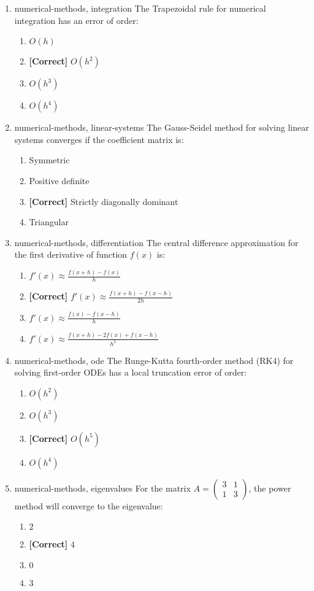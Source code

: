 \documentclass{article}
\newenvironment{problem}{\item}{}
\newcommand{\choice}{\item}
\newcommand{\correctchoice}{\item \textbf{[Correct] }}
\newcommand{\tags}[1]{#1} %
\begin{document}
\begin{enumerate}
        \begin{problem}
            \tags{numerical-methods, integration}
            The Trapezoidal rule for numerical integration has an error of order:
            \begin{enumerate}
                \choice $O(h)$
                \correctchoice $O(h^2)$
                \choice $O(h^3)$
                \choice $O(h^4)$
            \end{enumerate}
        \end{problem}
        
        \begin{problem}
            \tags{numerical-methods, linear-systems}
            The Gauss-Seidel method for solving linear systems converges if the coefficient matrix is:
            \begin{enumerate}
                \choice Symmetric
                \choice Positive definite
                \correctchoice Strictly diagonally dominant
                \choice Triangular
            \end{enumerate}
        \end{problem}
        
        \begin{problem}
            \tags{numerical-methods, differentiation}
            The central difference approximation for the first derivative of function $f(x)$ is:
            \begin{enumerate}
                \choice $f'(x) \approx \frac{f(x+h)-f(x)}{h}$
                \correctchoice $f'(x) \approx \frac{f(x+h)-f(x-h)}{2h}$
                \choice $f'(x) \approx \frac{f(x)-f(x-h)}{h}$
                \choice $f'(x) \approx \frac{f(x+h)-2f(x)+f(x-h)}{h^2}$
            \end{enumerate}
        \end{problem}
        
        \begin{problem}
            \tags{numerical-methods, ode}
            The Runge-Kutta fourth-order method (RK4) for solving first-order ODEs has a local truncation error of order:
            \begin{enumerate}
                \choice $O(h^2)$
                \choice $O(h^3)$
                \correctchoice $O(h^5)$
                \choice $O(h^4)$
            \end{enumerate}
        \end{problem}
        
        \begin{problem}
            \tags{numerical-methods, eigenvalues}
            For the matrix $A = \begin{pmatrix} 3 & 1 \\ 1 & 3 \end{pmatrix}$, the power method will converge to the eigenvalue:
            \begin{enumerate}
                \choice $2$
                \correctchoice $4$
                \choice $0$
                \choice $3$
            \end{enumerate}
        \end{problem}
        

\end{enumerate}
\end{document}
